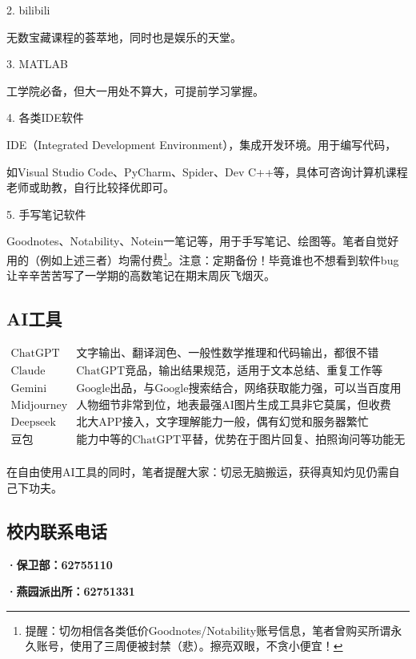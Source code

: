 \documentclass[11pt,oneside]{book}
\begin{document}
2. bilibili

无数宝藏课程的荟萃地，同时也是娱乐的天堂。

3. MATLAB

工学院必备，但大一用处不算大，可提前学习掌握。

4. 各类IDE软件

IDE（Integrated Development Environment），集成开发环境。用于编写代码，

如Visual Studio Code、PyCharm、Spider、Dev C++等，具体可咨询计算机课程老师或助教，自行比较择优即可。

5. 手写笔记软件

Goodnotes、Notability、Notein一笔记等，用于手写笔记、绘图等。笔者自觉好用的（例如上述三者）均需付费\footnote{提醒：切勿相信各类低价Goodnotes/Notability账号信息，笔者曾购买所谓永久账号，使用了三周便被封禁（悲）。擦亮双眼，不贪小便宜！}。注意：定期备份！毕竟谁也不想看到软件bug让辛辛苦苦写了一学期的高数笔记在期末周灰飞烟灭。

\subsection{AI工具}

\[
\begin{matrix}
    \text{ChatGPT} & \text{文字输出、翻译润色、一般性数学推理和代码输出，都很不错}\\
    \text{Claude} & \text{ChatGPT竞品，输出结果规范，适用于文本总结、重复工作等}\\
    \text{Gemini} & \text{Google出品，与Google搜索结合，网络获取能力强，可以当百度用}\\
    \text{Midjourney} & \text{人物细节非常到位，地表最强AI图片生成工具非它莫属，但收费（悲）}\\
    \text{Deepseek} & \text{北大APP接入，文字理解能力一般，偶有幻觉和服务器繁忙}\\
    \text{豆包} & \text{能力中等的ChatGPT平替，优势在于图片回复、拍照询问等功能无限制}\\
\end{matrix}
\]

在自由使用AI工具的同时，笔者提醒大家：切忌无脑搬运，获得真知灼见仍需自己下功夫。

\subsection{校内联系电话}

\textbf{·保卫部：62755110}

\textbf{·燕园派出所：62751331}
\end{document}

